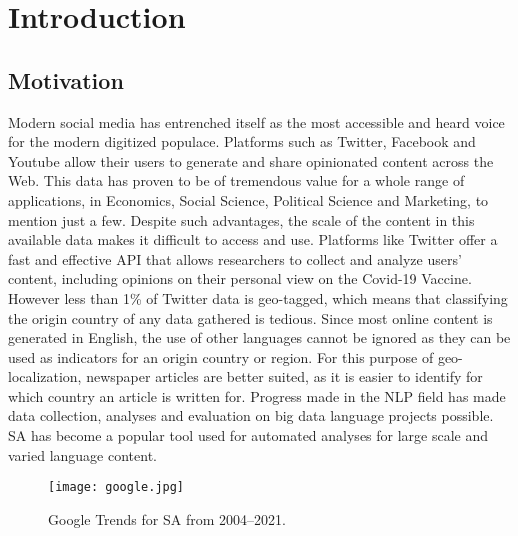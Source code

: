 \chapter{Introduction}


\section{Motivation} %

Modern social media has entrenched itself as the most accessible and heard voice for the modern digitized populace.
Platforms such as Twitter, Facebook and Youtube allow their users to generate and share opinionated content across the Web.
This data has proven to be of tremendous value for a whole range of applications, in Economics, Social Science, Political Science and Marketing, to mention just a few.
Despite such advantages, the scale of the content in this available data makes it difficult to access and use.
Platforms like Twitter offer a fast and effective \ac{API} that allows researchers to collect and analyze users' content, including opinions on their personal view on the Covid-19 Vaccine.
However less than 1\% of Twitter data is geo-tagged, which means that classifying the origin country of any data gathered is tedious.
Since most online content is generated in English, the use of other languages cannot be ignored as they can be used as indicators for an origin country or region.
For this purpose of geo-localization, newspaper articles are better suited, as it is easier to identify for which country an article is written for.
Progress made in the \ac{NLP} field has made data collection, analyses and evaluation on big data language projects possible.
\ac{SA} has become a popular tool used for automated analyses for large scale and varied language content.

\begin{figure}[ht!]
  \centering
  \texttt{[image: google.jpg]}
  \caption[Google Trends for \ac{SA} from 2004--2021]{Google Trends for \ac{SA} from 2004--2021.}
  \label{fig:googletrend}
\end{figure}



